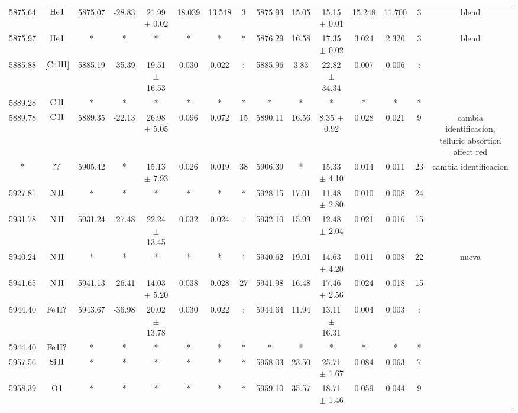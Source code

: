 \documentclass{article}
\begin{document}
\begin{table*}
\begin{adjustbox}{width=\textwidth}
\begin{tabular}{ccccccccccccccc}
5875.64 & $\mbox{He}\thinspace \mbox{I}$ & 5875.07 & -28.83 & 21.99 $\pm$ 0.02 & 18.039 & 13.548 & 3 & 5875.93 & 15.05 & 15.15 $\pm$ 0.01 & 15.248 & 11.700 & 3 &  blend \\
5875.97 & $\mbox{He}\thinspace \mbox{I}$ & * & * & * & * & * & * & 5876.29 & 16.58 & 17.35 $\pm$ 0.02 & 3.024 & 2.320 & 3 &  blend \\
5885.88 & $\mbox{[Cr}\thinspace \mbox{III]}$ & 5885.19 & -35.39 & 19.51 $\pm$ 16.53 & 0.030 & 0.022 & : & 5885.96 & 3.83 & 22.82 $\pm$ 34.34 & 0.007 & 0.006 & : &  \\
5889.28 & $\mbox{C}\thinspace \mbox{II}$ & * & * & * & * & * & * & * & * & * & * & * & * &  \\
5889.78 & $\mbox{C}\thinspace \mbox{II}$ & 5889.35 & -22.13 & 26.98 $\pm$ 5.05 & 0.096 & 0.072 & 15 & 5890.11 & 16.56 & 8.35 $\pm$ 0.92 & 0.028 & 0.021 & 9 &  cambia identificacion, telluric absortion affect red \\
* & $\mbox{??}\thinspace \mbox{}$ & 5905.42 & * & 15.13 $\pm$ 7.93 & 0.026 & 0.019 & 38 & 5906.39 & * & 15.33 $\pm$ 4.10 & 0.014 & 0.011 & 23 &  cambia identificacion \\
5927.81 & $\mbox{N}\thinspace \mbox{II}$ & * & * & * & * & * & * & 5928.15 & 17.01 & 11.48 $\pm$ 2.80 & 0.010 & 0.008 & 24 &  \\
5931.78 & $\mbox{N}\thinspace \mbox{II}$ & 5931.24 & -27.48 & 22.24 $\pm$ 13.45 & 0.032 & 0.024 & : & 5932.10 & 15.99 & 12.48 $\pm$ 2.04 & 0.021 & 0.016 & 15 &  \\
5940.24 & $\mbox{N}\thinspace \mbox{II}$ & * & * & * & * & * & * & 5940.62 & 19.01 & 14.63 $\pm$ 4.20 & 0.011 & 0.008 & 22 &  nueva \\
5941.65 & $\mbox{N}\thinspace \mbox{II}$ & 5941.13 & -26.41 & 14.03 $\pm$ 5.20 & 0.038 & 0.028 & 27 & 5941.98 & 16.48 & 17.46 $\pm$ 2.56 & 0.024 & 0.018 & 15 &  \\
5944.40 & $\mbox{Fe}\thinspace \mbox{II?}$ & 5943.67 & -36.98 & 20.02 $\pm$ 13.78 & 0.030 & 0.022 & : & 5944.64 & 11.94 & 13.11 $\pm$ 16.31 & 0.004 & 0.003 & : &  \\
5944.40 & $\mbox{Fe}\thinspace \mbox{II?}$ & * & * & * & * & * & * & * & * & * & * & * & * &  \\
5957.56 & $\mbox{Si}\thinspace \mbox{II}$ & * & * & * & * & * & * & 5958.03 & 23.50 & 25.71 $\pm$ 1.67 & 0.084 & 0.063 & 7 &  \\
5958.39 & $\mbox{O}\thinspace \mbox{I}$ & * & * & * & * & * & * & 5959.10 & 35.57 & 18.71 $\pm$ 1.46 & 0.059 & 0.044 & 9 &  \\

\end{tabular}
\end{adjustbox}
\end{table*}
\end{document}
